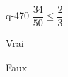 \begin{truefalse}{q-470}
$\dfrac{34}{50} \leq \dfrac{2}{3}$
\item Vrai
\item* Faux
\end{truefalse}

